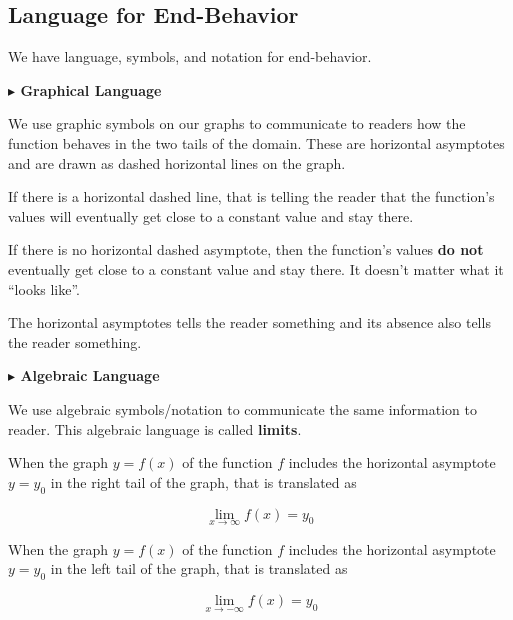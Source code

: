 \documentclass{ximera}
\begin{document}
\subsection*{Language for End-Behavior}


We have language, symbols, and notation for end-behavior. 



\textbf{\textcolor{blue!55!black}{$\blacktriangleright$ Graphical Language}} 


We use graphic symbols on our graphs to communicate to readers how the function behaves in the two tails of the domain.  These are horizontal asymptotes and are drawn as dashed horizontal lines on the graph.

If there is a horizontal dashed line, that is telling the reader that the function's values will eventually get close to a constant value and stay there. 

If there is no horizontal dashed asymptote, then the function's values \textbf{do not} eventually get close to a constant value and stay there. It doesn't matter what it ``looks like''.

The horizontal asymptotes tells the reader something and its absence also tells the reader something. 








\textbf{\textcolor{blue!55!black}{$\blacktriangleright$ Algebraic Language}} 


We use algebraic symbols/notation to communicate the same information to reader.  This algebraic language is called \textbf{limits}. 


When the graph $y = f(x)$ of the function $f$ includes the horizontal asymptote $y = y_0$ in the right tail of the graph, that is translated as


\[
\lim\limits_{x \to \infty}f(x) = y_0
\]





When the graph $y = f(x)$ of the function $f$ includes the horizontal asymptote $y = y_0$ in the left tail of the graph, that is translated as


\[
\lim\limits_{x \to -\infty}f(x) = y_0
\]
\end{document}
